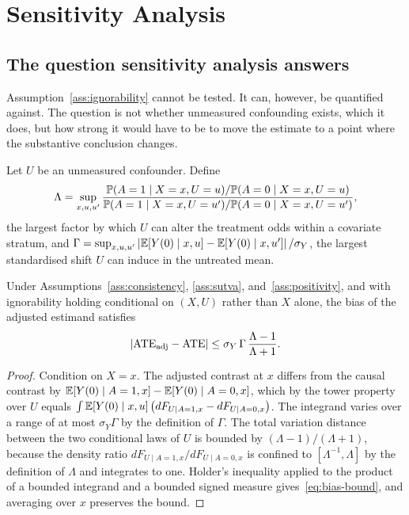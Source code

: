\chapter{Sensitivity Analysis}
\label{chap:sensitivity}

\section{The question sensitivity analysis answers}
\label{sec:sens-question}

Assumption~\ref{ass:ignorability} cannot be tested. It can, however, be
quantified against. The question is not whether unmeasured confounding exists,
which it does, but how strong it would have to be to move the estimate to a
point where the substantive conclusion changes.

\begin{definition}
\label{def:sensitivity-params}
Let $U$ be an unmeasured confounder. Define
\begin{equation*}
  \Lambda = \sup_{x, u, u'}
    \frac{\mathbb{P}(A = 1 \mid X = x, U = u) / \mathbb{P}(A = 0 \mid X = x, U = u)}
         {\mathbb{P}(A = 1 \mid X = x, U = u') / \mathbb{P}(A = 0 \mid X = x, U = u')},
\end{equation*}
the largest factor by which $U$ can alter the treatment odds within a covariate
stratum, and
$\Gamma = \sup_{x,u,u'} \left| \mathbb{E}[Y(0) \mid x, u] - \mathbb{E}[Y(0) \mid x, u'] \right| / \sigma_Y$,
the largest standardised shift $U$ can induce in the untreated mean.
\end{definition}

\begin{theorem}
\label{thm:bias-bound}
Under Assumptions~\ref{ass:consistency}, \ref{ass:sutva},
and~\ref{ass:positivity}, and with ignorability holding conditional on
$(X, U)$ rather than $X$ alone, the bias of the adjusted estimand satisfies
\begin{equation}
  \left| \mathrm{ATE}_{\mathrm{adj}} - \mathrm{ATE} \right|
    \leq \sigma_Y \, \Gamma \, \frac{\Lambda - 1}{\Lambda + 1}.
  \label{eq:bias-bound}
\end{equation}
\end{theorem}

\begin{proof}
Condition on $X = x$. The adjusted contrast at $x$ differs from the causal
contrast by
$\mathbb{E}[Y(0) \mid A=1, x] - \mathbb{E}[Y(0) \mid A=0, x]$, which by the tower property over
$U$ equals $\int \mathbb{E}[Y(0) \mid x, u] \left( dF_{U \mid A=1,x} - dF_{U \mid A=0,x} \right)$.
The integrand varies over a range of at most $\sigma_Y \Gamma$ by the definition
of $\Gamma$. The total variation distance between the two conditional laws of
$U$ is bounded by $(\Lambda - 1)/(\Lambda + 1)$, because the density ratio
$dF_{U \mid A=1,x} / dF_{U \mid A=0,x}$ is confined to
$[\Lambda^{-1}, \Lambda]$ by the definition of $\Lambda$ and integrates to one.
Holder's inequality applied to the product of a bounded integrand and a bounded
signed measure gives~\eqref{eq:bias-bound}, and averaging over $x$ preserves
the bound.
\end{proof}

